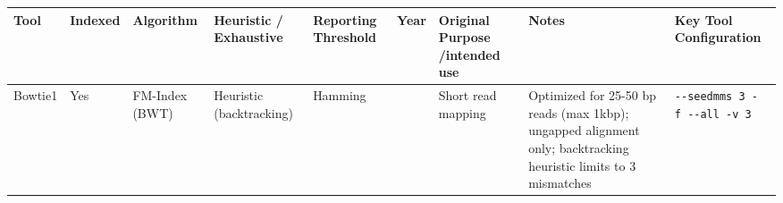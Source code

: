 \documentclass[
]{article}
\begin{document}
\begin{longtable}[]{@{}
  >{\raggedright\arraybackslash}p{}
  >{\raggedright\arraybackslash}p{}
  >{\raggedright\arraybackslash}p{}
  >{\raggedright\arraybackslash}p{}
  >{\raggedright\arraybackslash}p{}
  >{\raggedright\arraybackslash}p{}
  >{\raggedright\arraybackslash}p{}
  >{\raggedright\arraybackslash}p{}
  >{\raggedright\arraybackslash}p{}@{}}
\toprule\noalign{}
\begin{minipage}[b]{\linewidth}\raggedright
Tool
\end{minipage} & \begin{minipage}[b]{\linewidth}\raggedright
Indexed
\end{minipage} & \begin{minipage}[b]{\linewidth}\raggedright
Algorithm
\end{minipage} & \begin{minipage}[b]{\linewidth}\raggedright
Heuristic / Exhaustive
\end{minipage} & \begin{minipage}[b]{\linewidth}\raggedright
Reporting Threshold
\end{minipage} & \begin{minipage}[b]{\linewidth}\raggedright
Year
\end{minipage} & \begin{minipage}[b]{\linewidth}\raggedright
Original Purpose /intended use
\end{minipage} & \begin{minipage}[b]{\linewidth}\raggedright
Notes
\end{minipage} & \begin{minipage}[b]{\linewidth}\raggedright
Key Tool Configuration
\end{minipage} \\
\midrule\noalign{}
\endhead
\bottomrule\noalign{}
\endlastfoot
Bowtie1 & Yes & FM-Index (BWT) & Heuristic (backtracking) & Hamming &
2009 & Short read mapping & Optimized for 25-50 bp reads (max 1kbp);
ungapped alignment only; backtracking heuristic limits to 3 mismatches &
\texttt{-\/-seedmms\ 3\ -f\ -\/-all\ -v\ 3} \\

\end{longtable}
\end{document}
